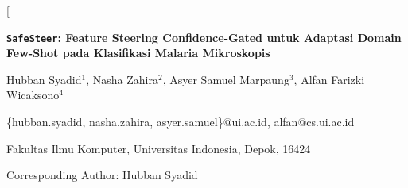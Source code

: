 \documentclass[conference]{IEEEtran}
\newcommand{\nama}[1]{\textbf{\texttt{#1}}}
\begin{document}
\twocolumn[
\begin{center}
{\LARGE \bfseries \nama{SafeSteer}: Feature Steering Confidence-Gated untuk Adaptasi Domain Few-Shot pada Klasifikasi Malaria Mikroskopis \par}
\vspace{1.5em}

    {\large Hubban Syadid$^1$, Nasha Zahira$^2$, Asyer Samuel Marpaung$^3$, Alfan Farizki Wicaksono$^4$ \par}
    \vspace{0.5em}
    {\small \{hubban.syadid, nasha.zahira, asyer.samuel\}@ui.ac.id, alfan@cs.ui.ac.id \par}
    {\small Fakultas Ilmu Komputer, Universitas Indonesia, Depok, 16424 \par}
    {\small Corresponding Author: Hubban Syadid \par}

\end{center}
\vspace{1.5em}
\end{document}
